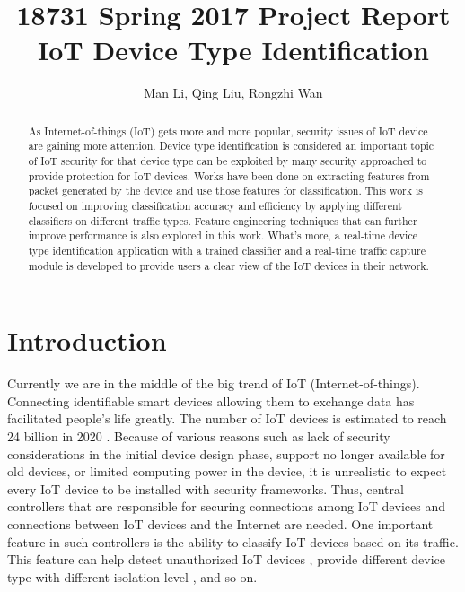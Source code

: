 \documentclass[twocolumn,10pt]{article}
\begin{document}
	\title{18731 Spring 2017 Project Report\\ IoT Device Type Identification} %
	
\author{
Man Li, Qing Liu, Rongzhi Wan
  }

\maketitle

\begin{abstract}
As Internet-of-things (IoT) gets more and more popular, security issues of IoT device are gaining more attention. Device type identification is considered an important topic of IoT security for that device type can be exploited by many security approached to provide protection for IoT devices. Works have been done on extracting features from packet generated by the device and use those features for classification. This work is focused on improving classification accuracy and efficiency by applying different classifiers on different traffic types. Feature engineering techniques that can further improve performance is also explored in this work. What’s more, a real-time device type identification application with a trained classifier and a real-time traffic capture module is developed to provide users a clear view of the IoT devices in their network.
\end{abstract}


\section{Introduction}

Currently we are in the middle of the big trend of IoT (Internet-of-things). Connecting identifiable smart devices allowing them to exchange data has facilitated people’s life greatly. The number of IoT devices is estimated to reach 24 billion in 2020 \cite{greenough_2016_website}. Because of various reasons such as lack of security considerations in the initial device design phase, support no longer available for old devices, or limited computing power in the device, it is unrealistic to expect every IoT device to be installed with security frameworks. Thus, central controllers that are responsible for securing connections among IoT devices and connections between IoT devices and the Internet are needed. One important feature in such controllers is the ability to classify IoT devices based on its traffic. This feature can help detect unauthorized IoT devices \cite{meidan_2017_unauthorized}, provide different device type with different isolation level \cite{miettinen2017iot}, and so on.
\end{document}
